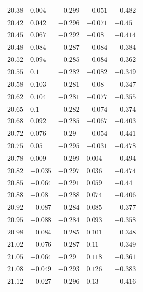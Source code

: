 \begin{center}
\begin{longtable}{lllll}
$20.38$&$0.004$&$-0.299$&$-0.051$&$-0.482$\\
$20.42$&$0.042$&$-0.296$&$-0.071$&$-0.45$\\
$20.45$&$0.067$&$-0.292$&$-0.08$&$-0.414$\\
$20.48$&$0.084$&$-0.287$&$-0.084$&$-0.384$\\
$20.52$&$0.094$&$-0.285$&$-0.084$&$-0.362$\\
$20.55$&$0.1$&$-0.282$&$-0.082$&$-0.349$\\
$20.58$&$0.103$&$-0.281$&$-0.08$&$-0.347$\\
$20.62$&$0.104$&$-0.281$&$-0.077$&$-0.355$\\
$20.65$&$0.1$&$-0.282$&$-0.074$&$-0.374$\\
$20.68$&$0.092$&$-0.285$&$-0.067$&$-0.403$\\
$20.72$&$0.076$&$-0.29$&$-0.054$&$-0.441$\\
$20.75$&$0.05$&$-0.295$&$-0.031$&$-0.478$\\
$20.78$&$0.009$&$-0.299$&$0.004$&$-0.494$\\
$20.82$&$-0.035$&$-0.297$&$0.036$&$-0.474$\\
$20.85$&$-0.064$&$-0.291$&$0.059$&$-0.44$\\
$20.88$&$-0.08$&$-0.288$&$0.074$&$-0.406$\\
$20.92$&$-0.087$&$-0.284$&$0.085$&$-0.377$\\
$20.95$&$-0.088$&$-0.284$&$0.093$&$-0.358$\\
$20.98$&$-0.084$&$-0.285$&$0.101$&$-0.348$\\
$21.02$&$-0.076$&$-0.287$&$0.11$&$-0.349$\\
$21.05$&$-0.064$&$-0.29$&$0.118$&$-0.361$\\
$21.08$&$-0.049$&$-0.293$&$0.126$&$-0.383$\\
$21.12$&$-0.027$&$-0.296$&$0.13$&$-0.416$\\
\end{longtable}
\end{center}
